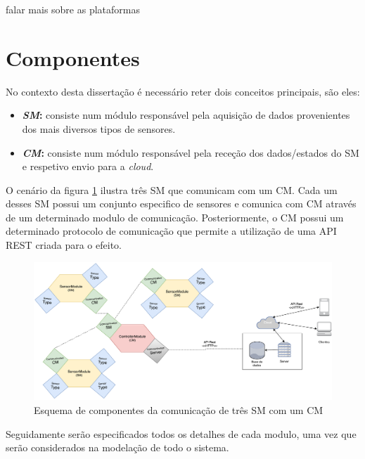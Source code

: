 falar mais sobre as plataformas 



\newpage
\section{Componentes}

No contexto desta dissertação é necessário reter dois conceitos principais, são eles: 

\begin{itemize}
	\item \textbf{\textit{\acl{SM}}:} consiste num módulo responsável pela aquisição de dados provenientes dos mais diversos tipos de sensores.
	
	
	\item \textbf{\textit{\acl{CM}}:} consiste num módulo responsável pela receção dos dados/estados do \acl{SM} e respetivo envio para a \textit{cloud}.  
	
\end{itemize}


O cenário da figura \ref{esquema1} ilustra três \acl{SM} que comunicam com um \acl{CM}. Cada um desses \acl{SM} possui um conjunto especifico de sensores e comunica com \acl{CM} através de um determinado modulo de comunicação. Posteriormente, o \acl{CM} possui um determinado protocolo de comunicação que permite a utilização de uma API REST criada para o efeito. 




\begin{figure}[h]
	\centering
	\includegraphics[width=\linewidth]{esquemas/general-electronic-modules.pdf}
	\caption{Esquema de componentes da comunicação de três \ac{SM} com um \ac{CM}}
	\label{esquema1}
\end{figure}


Seguidamente serão especificados todos os detalhes de cada modulo, uma vez que serão considerados na modelação de todo o sistema. 



